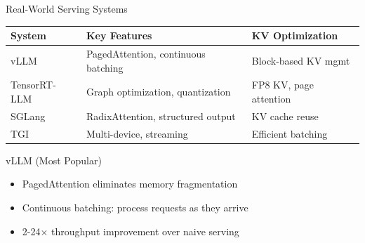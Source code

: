 \documentclass[aspectratio=169, 11pt]{beamer}
\begin{document}
\begin{frame}{Real-World Serving Systems}

	\begin{center}
		\small
		\begin{tabular}{@{}lp{5cm}l@{}}
			\toprule
			\textbf{System} & \textbf{Key Features} & \textbf{KV Optimization} \\
			\midrule
			vLLM            & PagedAttention, continuous batching & Block-based KV mgmt \\
			TensorRT-LLM    & Graph optimization, quantization    & FP8 KV, page attention \\
			SGLang          & RadixAttention, structured output   & KV cache reuse \\
			TGI             & Multi-device, streaming             & Efficient batching \\
			\bottomrule
		\end{tabular}
	\end{center}

	\begin{block}{vLLM (Most Popular)}
		\begin{itemize}
			\item PagedAttention eliminates memory fragmentation
			\item Continuous batching: process requests as they arrive
			\item 2-24$\times$ throughput improvement over naive serving
		\end{itemize}
	\end{block}

\end{frame}
\end{document}
